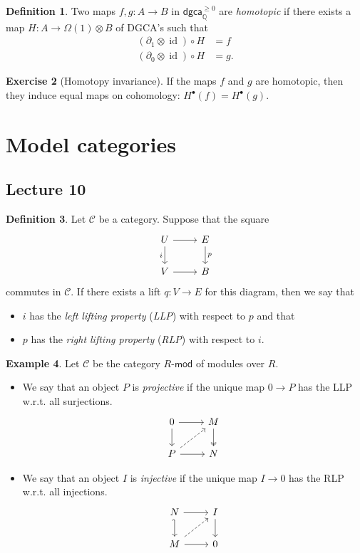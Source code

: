 \documentclass[10pt,letterpaper,cm]{nupset}
\theoremstyle{definition}
\newtheorem{defn}{Definition}[subsection]
\newtheorem{exmp}[defn]{Example}
\theoremstyle{theorem}
\newtheorem{exercise}[defn]{Exercise}
\theoremstyle{remark}
\newcommand{\Q}{\mathbb Q}
\newcommand{\1}{\mathbb{1}}
\renewcommand{\c}{\mathcal{C}}
\newcommand{\dgca}{\mathsf{dgca}}
\newcommand{\0}{\vec 0}
\DeclareMathOperator{\id}{id}
\newcommand{\bi}{\begin{itemize}}
\newcommand{\ei}{\end{itemize}}
\begin{document}
\begin{defn}
Two maps $f,g : A \to B$ in $\dgca_{\Q}^{\geq 0}$ are \textit{homotopic} if there exists a map $H : A \to \Omega(1) \otimes B$ of DGCA's such that
\begin{align*}
\left(\partial_1 \otimes \id\right) \circ H & = f
\\ \left(\partial_0 \otimes \id\right) \circ H & = g.
\end{align*}
\end{defn}

\begin{exercise}[Homotopy invariance]
If the maps $f$ and $g$ are homotopic, then they induce equal maps on cohomology: $H^{\bullet}(f) = H^{\bullet}(g)$.
\end{exercise}

\section{Model categories}

\subsection{Lecture 10}

\begin{defn}
Let $\c$ be a category. Suppose that the square
\[
\begin{tikzcd}
	U & E \\
	V & B
	\arrow["i"', from=1-1, to=2-1]
	\arrow[from=2-1, to=2-2]
	\arrow["p", from=1-2, to=2-2]
	\arrow[from=1-1, to=1-2]
\end{tikzcd}
\] commutes in $\c$. If there exists a lift $q : V \to E$ for this diagram, then we say that
\bi
\item $i$ has the \textit{left lifting property} (\textit{LLP}) with respect to $p$ and that
\item $p$ has the \textit{right lifting property} (\textit{RLP}) with respect to $i$.
\ei
\end{defn}

\begin{exmp}
Let $\c$ be the category $R\text{-}\mathsf{mod}$ of modules over $R$. 
\bi
\item We say that an object $P$ is \textit{projective} if the unique map $0 \to P$ has the LLP w.r.t. all surjections.
\[
\begin{tikzcd}
	0 & M \\
	P & N
	\arrow[from=1-1, to=2-1]
	\arrow[from=1-1, to=1-2]
	\arrow[two heads, from=1-2, to=2-2]
	\arrow[from=2-1, to=2-2]
	\arrow[dashed, from=2-1, to=1-2]
\end{tikzcd}
\]
\item We say that an object $I$ is \textit{injective} if the unique map $I \to 0$ has the RLP w.r.t. all injections. 
\[
\begin{tikzcd}
	N & I \\
	M & 0
	\arrow[from=1-1, to=1-2]
	\arrow[hook', from=1-1, to=2-1]
	\arrow[from=2-1, to=2-2]
	\arrow[from=1-2, to=2-2]
	\arrow[dashed, from=2-1, to=1-2]
\end{tikzcd}
\]
\ei
\end{exmp}
\end{document}
